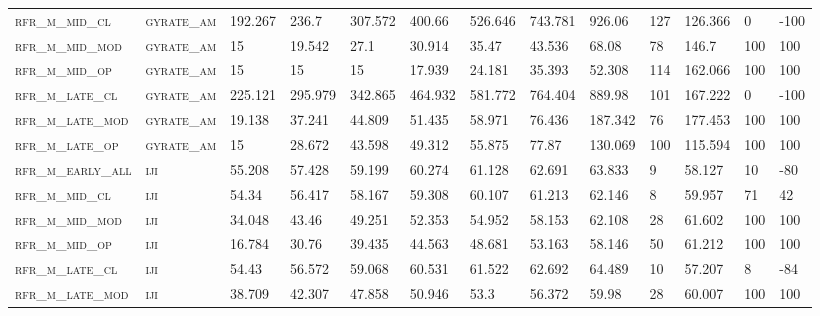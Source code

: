 \begin{landscape}
\begin{center}
\begin{footnotesize}
\begin{longtable}{lllllllllllll}
\textsc{rfr\_m\_mid\_cl   } & \textsc{gyrate\_am}   & 192.267 & 236.7   & 307.572  & 400.66   & 526.646  & 743.781  & 926.06   & 127    & 126.366       & 0             & -100     \\
\textsc{rfr\_m\_mid\_mod  } & \textsc{gyrate\_am}   & 15      & 19.542  & 27.1     & 30.914   & 35.47    & 43.536   & 68.08    & 78     & 146.7         & 100           & 100      \\
\textsc{rfr\_m\_mid\_op   } & \textsc{gyrate\_am}   & 15      & 15      & 15       & 17.939   & 24.181   & 35.393   & 52.308   & 114    & 162.066       & 100           & 100      \\
\textsc{rfr\_m\_late\_cl  } & \textsc{gyrate\_am}   & 225.121 & 295.979 & 342.865  & 464.932  & 581.772  & 764.404  & 889.98   & 101    & 167.222       & 0             & -100     \\
\textsc{rfr\_m\_late\_mod } & \textsc{gyrate\_am}   & 19.138  & 37.241  & 44.809   & 51.435   & 58.971   & 76.436   & 187.342  & 76     & 177.453       & 100           & 100      \\
\textsc{rfr\_m\_late\_op  } & \textsc{gyrate\_am}   & 15      & 28.672  & 43.598   & 49.312   & 55.875   & 77.87    & 130.069  & 100    & 115.594       & 100           & 100      \\
\textsc{rfr\_m\_early\_all} & \textsc{iji       }   & 55.208  & 57.428  & 59.199   & 60.274   & 61.128   & 62.691   & 63.833   & 9      & 58.127        & 10            & -80      \\
\textsc{rfr\_m\_mid\_cl   } & \textsc{iji       }   & 54.34   & 56.417  & 58.167   & 59.308   & 60.107   & 61.213   & 62.146   & 8      & 59.957        & 71            & 42       \\
\textsc{rfr\_m\_mid\_mod  } & \textsc{iji       }   & 34.048  & 43.46   & 49.251   & 52.353   & 54.952   & 58.153   & 62.108   & 28     & 61.602        & 100           & 100      \\
\textsc{rfr\_m\_mid\_op   } & \textsc{iji       }   & 16.784  & 30.76   & 39.435   & 44.563   & 48.681   & 53.163   & 58.146   & 50     & 61.212        & 100           & 100      \\
\textsc{rfr\_m\_late\_cl  } & \textsc{iji       }   & 54.43   & 56.572  & 59.068   & 60.531   & 61.522   & 62.692   & 64.489   & 10     & 57.207        & 8             & -84      \\
\textsc{rfr\_m\_late\_mod } & \textsc{iji       }   & 38.709  & 42.307  & 47.858   & 50.946   & 53.3     & 56.372   & 59.98    & 28     & 60.007        & 100           & 100      \\

\end{longtable}
\end{footnotesize}
\end{center}
\end{landscape}
